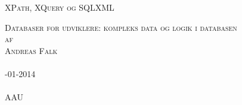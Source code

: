 


\begin{center}

\Large
\textsc{XPath, XQuery og SQLXML}\\

\vspace{5cm}

\textsc{Databaser for udviklere: kompleks data og logik i databasen\\[0.5\baselineskip]
af\\[0.5\baselineskip]
Andreas Falk\\
{\normalsize \textsc{}}}\\

\vspace{5cm}
\textsc{-01-2014}\\ %

\vspace{1cm}
\textsc{%
}\\

\vspace{1cm}
\textsc{AAU\\
}\\

\end{center}

